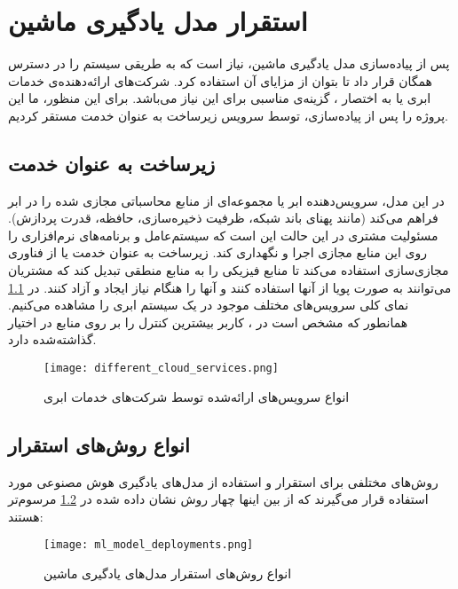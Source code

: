 \chapter{استقرار مدل یادگیری ماشین}

پس از پیاده‌سازی مدل یادگیری ماشین، نیاز است که به طریقی سیستم را در دسترس همگان قرار داد تا بتوان از مزایای آن استفاده کرد. شرکت‌های ارائه‌دهنده‌ی خدمات ابری یا به اختصار ، گزینه‌ی مناسبی برای این نیاز می‌باشد. برای این منظور، ما این پروژه را پس از پیاده‌سازی، توسط سرویس زیرساخت به عنوان خدمت مستقر کردیم.


\section{زیرساخت به عنوان خدمت}
در این مدل، سرویس‌دهنده ابر یا  مجموعه‌ای از منابع محاسباتی مجازی شده را در ابر فراهم می‌کند (مانند پهنای باند شبکه، ظرفیت ذخیره‌سازی، حافظه، قدرت پردازش). مسئولیت مشتری در این حالت این است که سیستم‌عامل و برنامه‌های نرم‌افزاری را روی این منابع مجازی اجرا و نگهداری کند. زیرساخت به عنوان خدمت یا  از فناوری مجازی‌سازی استفاده می‌کند تا منابع فیزیکی را به منابع منطقی تبدیل کند که مشتریان می‌توانند به صورت پویا از آنها استفاده کنند و آنها را هنگام نیاز ایجاد و آزاد کنند\cite{youssef2012exploring}. در \cref{fig:different_cloud_services} نمای کلی سرویس‌های مختلف موجود در یک سیستم ابری را مشاهده می‌کنیم. همانطور که مشخص است در ، کاربر بیشترین کنترل را بر روی منابع در اختیار گذاشته‌شده دارد\cite{serrano2015infrastructure}.



\begin{figure}[!h]
\centerline{\texttt{[image: different\_cloud\_services.png]}}
\caption{انواع سرویس‌های ارائه‌شده توسط شرکت‌های خدمات ابری}
\label{fig:different_cloud_services}
\end{figure}


\section{انواع روش‌های استقرار}
 روش‌های مختلفی برای استقرار و استفاده از مدل‌های یادگیری هوش مصنوعی مورد استفاده قرار می‌گیرند که از بین اینها چهار روش نشان داده‌ شده در \cref{fig:ml_model_deployments} مرسوم‌تر هستند\cite{kaggleMLdeployments}:

\begin{figure}[!h]
\centerline{\texttt{[image: ml\_model\_deployments.png]}}
\caption{انواع روش‌های استقرار مدل‌های یادگیری ماشین}
\label{fig:ml_model_deployments}
\end{figure}

